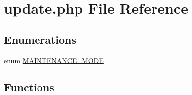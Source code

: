 \hypertarget{update_8php}{
\section{update.php File Reference}
\label{update_8php}
}
\subsection*{Enumerations}
\begin{CompactItemize}
\item 
enum \hyperlink{update_8php_5bf6dfe9ba7ee16c648e3932aa76535d}{MAINTENANCE\_\-MODE} 
\end{CompactItemize}
\subsection*{Functions}
